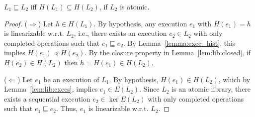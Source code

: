 \begin{theorem}

  $L_1 \sqsubseteq L_2$ if{f} $H(L_1) \subseteq H(L_2)$,
  if $L_2$ is atomic.

\end{theorem}

\begin{proof}

  ($\Rightarrow$)
  Let $h\in H(L_1)$. By hypothesis, any execution $e_1$ with $H(e_1)=h$ is
  linearizable w.r.t. $L_2$, i.e., there exists an execution $e_2\in L_2$ with
  only completed operations such that $e_1\sqsubseteq e_2$. By
  Lemma~\ref{lemma:exec_hist}, this implies $H(e_1)\preceq H(e_2)$. By the
  closure property in Lemma~\ref{lem:lib:closed}, if $H(e_2)\in H(L_2)$ then
  $h=H(e_1)\in H(L_2)$.

  ($\Leftarrow$)
  Let $e_1$ be an execution of $L_1$. By hypothesis, $H(e_1)\in H(L_2)$, which
  by Lemma~\ref{lem:lib:execs}, implies $e_1\in E(L_2)$. Since $L_2$ is an
  atomic library, there exists a sequential execution $e_2\in \ker E(L_2)$ with
  only completed operations such that $e_1\sqsubseteq e_2$. Thus, $e_1$ is
  linearizable w.r.t. $L_2$.
\end{proof}
